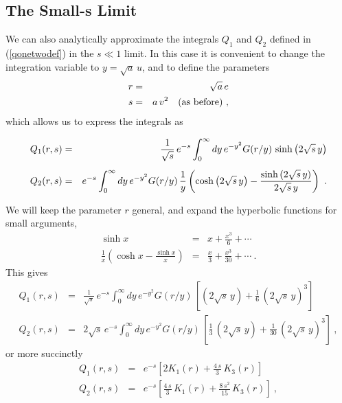 \documentclass[preprint,12pt,eqsecnum,nofootinbib,amsmath,amssymb]{revtex4}
\begin{document}
\pagebreak
\subsection{The Small-s Limit}

We can also analytically approximate the integrals $Q_1$ and 
$Q_2$ defined in (\ref{qonetwodef}) in the $s \ll 1$ limit. 
In this case it is convenient to change the integration variable 
to $y=\sqrt{a}\,u$, and to define the parameters
\begin{eqnarray}
  r &=& \sqrt{a}\,e
\\
  s &=& a\, v^2 ~~~{\rm (as~before)} \ ,
\end{eqnarray}
which allows us to express the integrals as
\begin{mathletters}
\label{qonetwoagain}
\begin{eqnarray}
  Q_1(r,s) &=& 
  \frac{1}{\sqrt{s}}\, e^{-s}
  \int_0^\infty dy \, e^{-y^2} G(r/y)\, \sinh\left(2 \sqrt{s}\,
   y \right) 
\\[5pt]
  Q_2(r,s) &=&
  e^{-s}\int_0^\infty dy \, e^{-y^2}
  G(r/y)\, \frac{1}{y} 
  \left(\cosh\left(2 \sqrt{s}\, y \right) - 
  {\sinh\left(2 \sqrt{s}\, y\right) 
  \over 2 \sqrt{s}\, y} \right)  \ .
\end{eqnarray}
\end{mathletters}
We will keep the parameter $r$ general, and expand the
hyperbolic functions for small arguments,
\begin{eqnarray}
  \sinh x &=& x + \frac{x^3}{6} + \cdots 
\\[5pt]
  \frac{1}{x} 
  \left(\cosh x - \frac{\sinh x}{x} 
  \right) &=& \frac{x}{3} + \frac{x^3}{30} +
  \cdots \ .
\end{eqnarray}
This gives
\begin{eqnarray}
  Q_1(r,s) &=& 
  \frac{1}{\sqrt{s}}\, e^{-s}
  \int_0^\infty dy \, e^{-y^2} G(r/y)\, \left[
  (2 \sqrt{s}\, y) + \frac{1}{6}\,\left(2 \sqrt{s}\, y
  \right)^3  \right]
\\[5pt]
  Q_2(r,s) &=&
  2\sqrt{s}\,e^{-s}\int_0^\infty dy \, e^{-y^2}
  G(r/y)\, \left[
  \frac{1}{3}\,(2 \sqrt{s}\, y) + 
  \frac{1}{30}\,\left(2 \sqrt{s}\, y
  \right)^3  \right] \ ,
\end{eqnarray}
or more succinctly 
\begin{eqnarray}
  Q_1(r,s) &=& e^{-s}\left[
  2 K_1(r) + \frac{4\,s}{3}\, K_3(r)  \right]
\\[5pt]
  Q_2(r,s) &=& e^{-s}\left[ 
  \frac{4\, s}{3}\,  K_1(r) + \frac{8\,s^2}{15}\,  K_3(r)
  \right]\ ,
\end{eqnarray}
\end{document}
